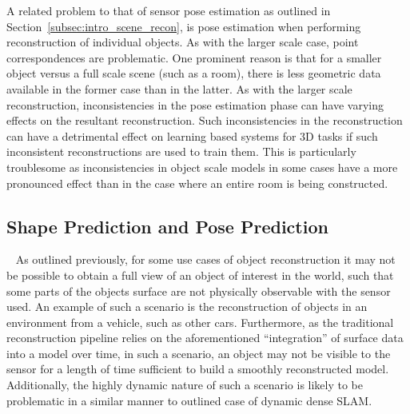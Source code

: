 A related problem to that of sensor pose estimation as outlined in Section~\ref{subsec:intro_scene_recon}, 
is pose estimation when performing reconstruction of individual objects. As with the larger scale case, point 
correspondences are problematic. One prominent reason is that for a smaller object versus a full scale scene 
(such as a room), there is less geometric data available in the former case than in the latter. As with the larger 
scale reconstruction, inconsistencies in the pose estimation phase can have varying effects on the resultant 
reconstruction. Such inconsistencies in the reconstruction can have a detrimental effect on learning based systems 
for 3D tasks if such inconsistent reconstructions are used to train them. This is particularly troublesome as 
inconsistencies in object scale models in some cases have a more pronounced effect than in the case where 
an entire room is being constructed.

\subsection{Shape Prediction and Pose Prediction}
~\label{subsec:intro_spp}
As outlined previously, for some use cases of object reconstruction it may not be possible to obtain a 
full view of an object of interest in the world, such that some parts of the objects surface are not 
physically observable with the sensor used. An example of such a scenario is the reconstruction of 
objects in an environment from a vehicle, such as other cars. Furthermore, as the traditional reconstruction 
pipeline relies on the aforementioned ``integration'' of surface data into a model over time, in such a 
scenario, an object may not be visible to the sensor for a length of time sufficient to build a smoothly 
reconstructed model. Additionally, the highly dynamic nature of such a scenario is likely to be problematic 
in a similar manner to outlined case of dynamic dense SLAM\@.


